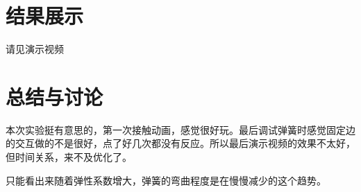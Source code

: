\documentclass{article}
\begin{document}
	
	
	\section{结果展示}
	
	请见演示视频
	
	\section{总结与讨论}
	
	本次实验挺有意思的，第一次接触动画，感觉很好玩。最后调试弹簧时感觉固定边的交互做的不是很好，点了好几次都没有反应。所以最后演示视频的效果不太好，但时间关系，来不及优化了。
	
	只能看出来随着弹性系数增大，弹簧的弯曲程度是在慢慢减少的这个趋势。
	
	
\end{document}
